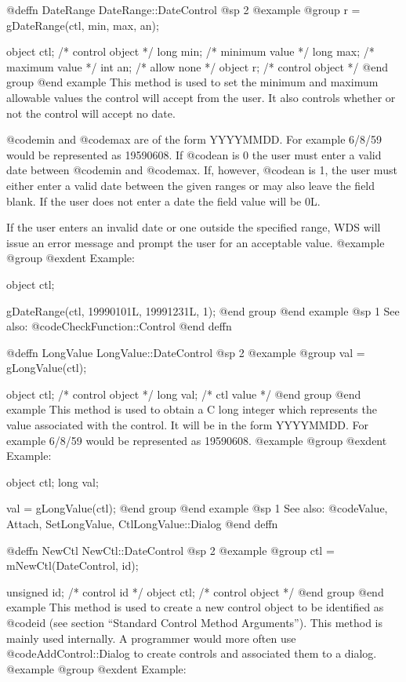 @deffn {DateRange} DateRange::DateControl
@sp 2
@example
@group
r = gDateRange(ctl, min, max, an);

object  ctl;   /*  control object  */
long    min;   /*  minimum value   */
long    max;   /*  maximum value   */
int     an;    /*  allow none      */
object  r;     /*  control object  */
@end group
@end example
This method is used to set the minimum and maximum allowable values
the control will accept from the user.  It also controls whether
or not the control will accept no date.

@code{min} and @code{max} are of the form YYYYMMDD.  For example
6/8/59 would be represented as 19590608.  If @code{an} is 0
the user must enter a valid date between @code{min} and @code{max}.
If, however, @code{an} is 1, the user must either enter a valid
date between the given ranges or may also leave the field blank.
If the user does not enter a date the field value will be 0L.

If the user enters an invalid date or one outside the specified range,
WDS will issue an error message and prompt the user for an acceptable
value.
@example
@group
@exdent Example:

object  ctl;

gDateRange(ctl, 19990101L, 19991231L, 1);
@end group
@end example
@sp 1
See also:  @code{CheckFunction::Control}
@end deffn








@deffn {LongValue} LongValue::DateControl
@sp 2
@example
@group
val = gLongValue(ctl);

object  ctl;   /*  control object  */
long    val;   /*  ctl value       */
@end group
@end example
This method is used to obtain a C long integer which represents the
value associated with the control.  It will be in the form YYYYMMDD.
For example 6/8/59 would be represented as 19590608.
@example
@group
@exdent Example:

object  ctl;
long    val;

val = gLongValue(ctl);
@end group
@end example
@sp 1
See also:  @code{Value, Attach, SetLongValue, CtlLongValue::Dialog}
@end deffn










@deffn {NewCtl} NewCtl::DateControl
@sp 2
@example
@group
ctl = mNewCtl(DateControl, id);

unsigned  id;   /*  control id      */
object   ctl;   /*  control object  */
@end group
@end example
This method is used to create a new control object to be identified as
@code{id} (see section ``Standard Control Method Arguments'').  This
method is mainly used internally.  A programmer would more often
use @code{AddControl::Dialog} to create controls and associated them
to a dialog.
@example
@group
@exdent Example:

